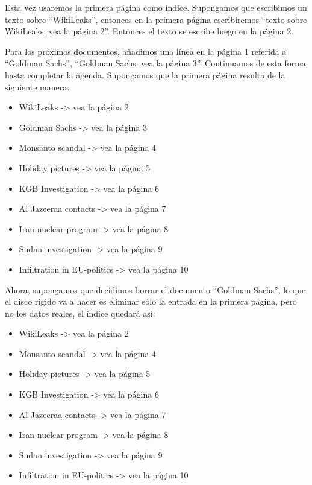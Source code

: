 \documentclass[10pt,a5paper,twoside,,]{book}
\providecommand{\tightlist}{%
  \setlength{\itemsep}{0pt}\setlength{\parskip}{0pt}}
\begin{document}
Esta vez usaremos la primera página como índice. Supongamos que
escribimos un texto sobre ``WikiLeaks'', entonces en la primera página
escribiremos ``texto sobre WikiLeaks: vea la página 2''. Entonces el
texto se escribe luego en la página 2.

Para los próximos documentos, añadimos una línea en la página 1 referida
a ``Goldman Sachs'', ``Goldman Sachs: vea la página 3''. Continuamos de
esta forma hasta completar la agenda. Supongamos que la primera página
resulta de la siguiente manera:

\begin{itemize}
\tightlist
\item
  WikiLeaks -\textgreater{} vea la página 2
\item
  Goldman Sachs -\textgreater{} vea la página 3
\item
  Monsanto scandal -\textgreater{} vea la página 4
\item
  Holiday pictures -\textgreater{} vea la página 5
\item
  KGB Investigation -\textgreater{} vea la página 6
\item
  Al Jazeeraa contacts -\textgreater{} vea la página 7
\item
  Iran nuclear program -\textgreater{} vea la página 8
\item
  Sudan investigation -\textgreater{} vea la página 9
\item
  Infiltration in EU-politics -\textgreater{} vea la página 10
\end{itemize}

Ahora, supongamos que decidimos borrar el documento ``Goldman Sachs'',
lo que el disco rígido va a hacer es eliminar sólo la entrada en la
primera página, pero no los datos reales, el índice quedará así:

\begin{itemize}
\tightlist
\item
  WikiLeaks -\textgreater{} vea la página 2
\item
  Monsanto scandal -\textgreater{} vea la página 4
\item
  Holiday pictures -\textgreater{} vea la página 5
\item
  KGB Investigation -\textgreater{} vea la página 6
\item
  Al Jazeeraa contacts -\textgreater{} vea la página 7
\item
  Iran nuclear program -\textgreater{} vea la página 8
\item
  Sudan investigation -\textgreater{} vea la página 9
\item
  Infiltration in EU-politics -\textgreater{} vea la página 10
\end{itemize}
\end{document}
